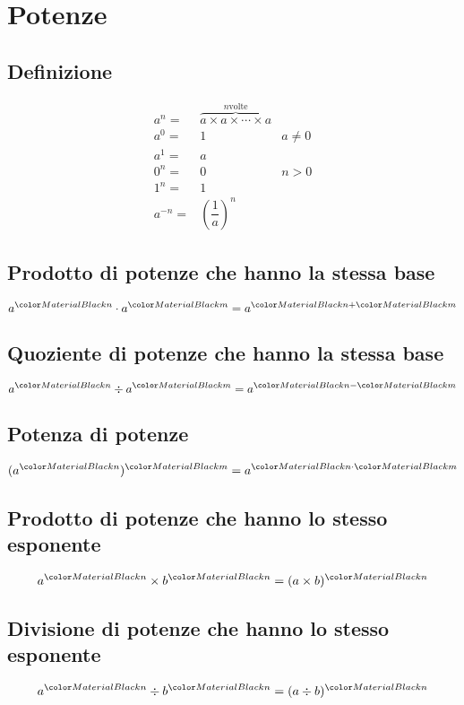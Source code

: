 \chapter{Potenze}
\section{Definizione}
\begin{align}
a^n=&\overbrace{a\times a\times\cdots\times a}^{n{}\mbox{volte}}\\
a^0=&1&a\neq0\\
a^1=&a\\
0^n=&0&n>0\\
1^n=&1\\
a^{-n}=&\left(\dfrac{1}{a}\right)^n
\end{align}
\section{Prodotto di potenze che hanno la stessa base}
\begin{equation}
a^\rosso{n}\cdot a^\verde{m}=a^{\rosso{n}+\verde{m}}
\end{equation}
\section{Quoziente di potenze che hanno la stessa base}
\begin{equation}
a^\rosso{n}\div a^\verde{m}=a^{\rosso{n}-\verde{m}}
\end{equation}
\section{Potenza di potenze}
\begin{equation}
(a^\rosso{n})^\verde{m}=a^{\rosso{n}\cdot \verde{m}}
\end{equation}
\section{Prodotto di potenze che hanno lo stesso esponente}
\begin{equation}
a^\rosso{n}\times b^\rosso{n}=(a\times b)^\rosso{n}
\end{equation}
\section{Divisione di potenze che hanno lo stesso esponente}
\begin{equation}
a^\rosso{n}\div b^\rosso{n}=(a\div b )^\rosso{n}
\end{equation}
